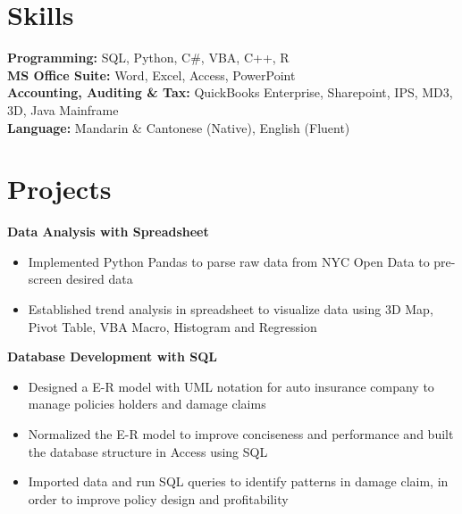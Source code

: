 \documentclass[10pt]{article} %
\begin{document}
{\begin{minipage}[t]{0.5\textwidth}
\end{minipage} %
\hfill
\begin{minipage}[t]{0.47\textwidth} %
\vspace{0pt} %


\section{Skills} 
\textbf{Programming:} SQL, Python, C\#, VBA, C++, R\\
\textbf{MS Office Suite:} Word, Excel, Access, PowerPoint\\
\textbf{Accounting, Auditing \& Tax:} QuickBooks Enterprise, Sharepoint, IPS, MD3, 3D, Java Mainframe \\
\textbf{Language:} Mandarin \& Cantonese (Native), English (Fluent)


\section{Projects} 

{\raggedright\normalsize
\textbf{Data Analysis with Spreadsheet}}

\begin{itemize}[leftmargin=*, topsep=2pt, partopsep=2.5pt]
\setlength\itemsep{1pt}
\item Implemented Python Pandas to parse raw data from NYC Open Data to pre-screen desired data    
\item Established trend analysis in spreadsheet to visualize data using 3D Map, Pivot Table, VBA Macro, Histogram and Regression
\end{itemize}




{\raggedright\normalsize
\textbf{Database Development with SQL}}

\begin{itemize}[leftmargin=*, topsep=2pt, partopsep=2.5pt]
\setlength\itemsep{1pt}
\item Designed a E-R model with UML notation for auto insurance company to manage policies holders and damage claims    
\item Normalized the E-R model to improve conciseness and performance and built the database structure in Access using SQL
\item Imported data and run SQL queries to identify patterns in damage claim, in order to improve policy design and profitability


\end{itemize}
\end{minipage}}
\end{document}
